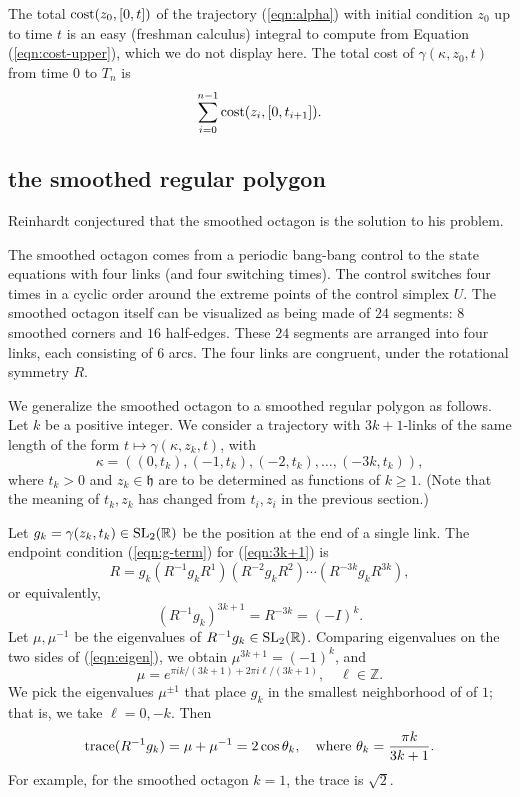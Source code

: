 \documentclass{article}
\theoremstyle{remark}
\newcommand{\ring}[1]{\mathbb{#1}}
\newcommand{\op}[1]{\hbox{#1}}
\def\SL{\op{SL}_2(\ring{R})}
\def\h{\mathfrak h}
\begin{document}
The total $\op{cost}(z_0,[0,t])$ of the trajectory (\ref{eqn:alpha})
with initial condition $z_0$ up to time $t$ is an easy (freshman
calculus) integral to compute from Equation (\ref{eqn:cost-upper}),
which we do not display here.  The total cost of
$\gamma(\kappa,z_0,t)$ from time $0$ to $T_n$ is
\begin{equation}\label{eqn:total-cost}
\sum_{i=0}^{n-1} \op{cost}(z_i,[0,t_{i+1}]).
\end{equation}



\subsection{the smoothed regular polygon}\label{sec:polygon}

Reinhardt conjectured that the smoothed octagon is the solution
to his problem.

The smoothed octagon comes from a periodic bang-bang control to the
state equations with four links (and four switching times).  The
control switches four times in a cyclic order around the extreme
points of the control simplex $U$.  The smoothed octagon itself can be
visualized as being made of $24$ segments: $8$ smoothed corners and
$16$ half-edges.  These $24$ segments are arranged into four links,
each consisting of $6$ arcs.  The four links are congruent, under the
rotational symmetry $R$.

We generalize the smoothed octagon to a smoothed regular polygon as
follows.  Let $k$ be a positive integer.  We consider a trajectory
with $3k+1$-links of the same length of the form
$t\mapsto\gamma(\kappa,z_k,t)$, with
\begin{equation}\label{eqn:3k+1}
\kappa = ((0,t_k),(-1,t_k),(-2,t_k),\ldots,(-3k,t_k)),
\end{equation}
where $t_k>0$ and $z_k\in\h$ are to be determined as functions of $k\ge1$.  
(Note that the meaning of $t_k,z_k$ has changed from $t_i,z_i$ in the previous
section.)

Let $g_k = \gamma(z_k,t_k)\in \SL$ be the position at the end of a
single link.  The endpoint condition (\ref{eqn:g-term}) for
(\ref{eqn:3k+1}) is
\[
R = g_k (R^{-1} g_k R^1) (R^{-2} g_k R^2) \cdots (R^{-3k} g_k R^{3k}),
\]
or equivalently,
\begin{equation}\label{eqn:eigen}
(R^{-1} g_k)^{3k+1} = R^{-3k} = (-I)^k.
\end{equation}
Let $\mu,\mu^{-1}$ be the eigenvalues of $R^{-1} g_k\in \SL$.
Comparing eigenvalues on the two sides of (\ref{eqn:eigen}), we obtain
$\mu^{3k+1} = (-1)^k$, and
\[
\mu = e^{\pi i k/(3k+1) + 2\pi i \ell/(3k+1)},\quad \ell \in\ring{Z}.
\]
We pick the eigenvalues $\mu^{\pm1}$ that place $g_k$ in the smallest
neighborhood of of $1$; that is, we take $\ell=0,-k$.  Then
\begin{equation}\label{eqn:theta-k}
\op{trace}(R^{-1} g_k) = \mu+\mu^{-1}=2\cos\theta_k,\quad 
\text{where } \theta_k= \frac{\pi k}{3k+1}.
\end{equation}
For example, for the smoothed octagon $k=1$, the trace is
$\sqrt{2}$.
\end{document}
